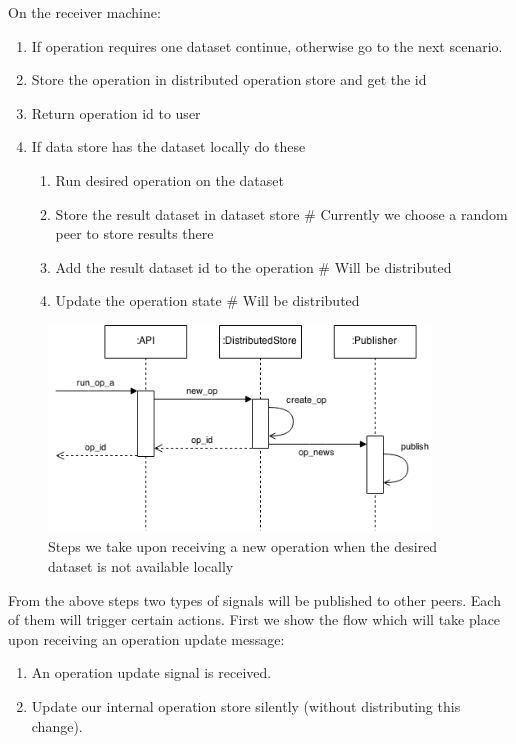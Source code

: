 On the receiver machine:
\begin{enumerate}
\item If operation requires one dataset continue, otherwise go to the next scenario.
\item Store the operation in distributed operation store and get the id
\item Return operation id to user
\item If data store has the dataset locally do these
  \begin{enumerate}
  \item Run desired operation on the dataset
  \item Store the result dataset in dataset store \# Currently we choose a random peer to store results there
  \item Add the result dataset id to the operation \# Will be distributed
  \item Update the operation state \# Will be distributed
  \end{enumerate}
\end{enumerate}

\begin{figure}[h]
  \centering
  \includegraphics[width=4in]{poster/figures/kseq.png}
  \caption[Sequence diagram of receiving a new operation]
   {Steps we take upon receiving a new operation when the desired dataset is not available locally}
\end{figure}

From the above steps two types of signals will be published to other peers. 
Each of them will trigger certain actions. 
First we show the flow which will take place upon receiving an operation update message:
\begin{enumerate}
\item An operation update signal is received.
\item Update our internal operation store silently (without distributing this change).
\end{enumerate}


